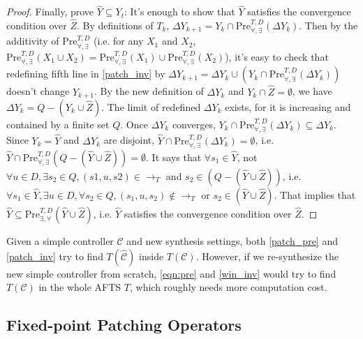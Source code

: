 \begin{proof}
	Finally, prove $ \widehat{Y}\subseteq Y_t $: It's enough to show that $ \widehat{Y} $ satisfies the convergence condition over $ \widehat{Z} $. By definitions of $ T_k $, $ \Delta Y_{k+1}= Y_k \cap \text{Pre}_{\forall,\exists}^{T, D}(\Delta Y_k)$. Then by the additivity of $ \text{Pre}^{T,D}_{\forall,\exists} $ (i.e. for any $ X_1 $ and $ X_2 $, $ \text{Pre}_{\forall,\exists}^{T,D} (X_1\cup X_2)=\text{Pre}_{\forall,\exists}^{T,D} (X_1)\cup \text{Pre}_{\forall,\exists}^{T,D} (X_2) $), it's easy to check that redefining fifth line in \eqref{patch_inv} by $ \Delta Y_{k+1} = \Delta Y_k \cup (Y_k \cap \text{Pre}_{\forall,\exists}^{T, D}(\Delta Y_k)) $ doesn't change $ Y_{k+1} $.  By the new definition of $ \Delta Y_k $ and $ Y_k \cap \widehat{Z} = \emptyset $, we have $ \Delta Y_k = Q-(Y_k\cup \widehat{Z}) $. The limit of redefined $ \Delta Y_k $ exists, for it is increasing and contained by a finite set $ Q $. Once $ \Delta Y_k $ converges, $ Y_k \cap \text{Pre}_{\forall,\exists}^{T, D}(\Delta Y_k)\subseteq \Delta Y_k $. Since $ Y_k=\widehat{Y} $ and $ \Delta Y_k $ are disjoint, $ \widehat{Y} \cap \text{Pre}_{\forall,\exists}^{T, D}(\Delta Y_k) = \emptyset $, i.e.  $ \widehat{Y} \cap \text{Pre}_{\forall,\exists}^{T, D}(Q-(\widehat{Y}\cup \widehat{Z})) = \emptyset $. It says that $ \forall s_1 \in \widehat{Y}$, not $\forall u\in D, \exists s_2\in Q, (s1,u,s2)\in \rightarrow_{T} $ and $s_2\in (Q-(\widehat{Y}\cup \widehat{Z}))$, i.e. $ \forall s_1 \in \widehat{Y}, \exists u\in D, \forall s_2 \in Q,  (s_1,u,s_2)\not\in \rightarrow_{T}$ or $ s_2\in (\widehat{Y}\cup \widehat{Z})$. That implies that $ \widehat{Y}\subseteq \text{Pre}_{\exists,\forall}^{T,D}(\widehat{Y}\cup \widehat{Z}) $, i.e. $ \widehat{Y} $ satisfies the convergence condition over $ \widehat{Z} $.
\end{proof}

Given a simple controller $ \mathcal{C} $ and new synthesis settings, both \eqref{patch_pre} and \eqref{patch_inv} try to find $ T(\widehat{\mathcal{C}}) $ inside $ T(\mathcal{C}) $. However, if we re-synthesize the new simple controller from scratch, \eqref{eqn:pre} and \eqref{win_inv} would try to find $ T(\mathcal{C}) $ in the whole AFTS $ T $, which roughly needs more computation cost.

\subsection{Fixed-point Patching Operators}


